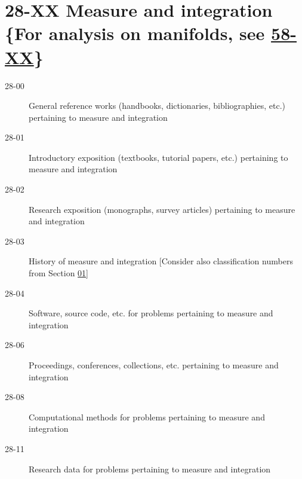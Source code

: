 \section*{28-XX Measure and integration \{For analysis on manifolds, see \hyperref[58-XX]{58-XX}\} }\label{28-XX}
\begin{description}
\item [28-00]\label{28-00} General reference works (handbooks, dictionaries, bibliographies, etc.) pertaining to measure and integration
\item [28-01]\label{28-01} Introductory exposition (textbooks, tutorial papers, etc.) pertaining to measure and integration
\item [28-02]\label{28-02} Research exposition (monographs, survey articles) pertaining to measure and integration
\item [28-03]\label{28-03} History of measure and integration [Consider also classification numbers from Section \hyperref[01-XX]{01}]
\item [28-04]\label{28-04} Software, source code, etc. for problems pertaining to measure and integration
\item [28-06]\label{28-06} Proceedings, conferences, collections, etc. pertaining to measure and integration
\item [28-08]\label{28-08} Computational methods for problems pertaining to measure and integration
\item [28-11]\label{28-11} Research data for problems pertaining to measure and integration
\end{description}
